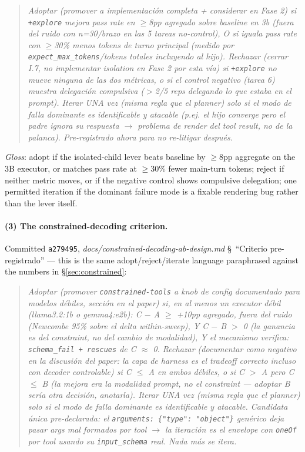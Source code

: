 \documentclass[smallcondensed,natbib]{svjour3}
\begin{document}
\begin{quote}\itshape\small
Adoptar (promover a implementaci\'on completa + considerar en Fase 2) si
\texttt{+explore} mejora pass rate en $\geq$8pp agregado sobre baseline
en 3b (fuera del ruido con n=30/brazo en las 5 tareas no-control), O si
iguala pass rate con $\geq$30\% menos tokens de turno principal (medido
por \texttt{expect\_max\_tokens}/tokens totales incluyendo al hijo).
Rechazar (cerrar I.7, no implementar isolation en Fase 2 por esta v\'ia)
si \texttt{+explore} no mueve ninguna de las dos m\'etricas, o si el
control negativo (tarea 6) muestra delegaci\'on compulsiva ($>$2/5 reps
delegando lo que estaba en el prompt). Iterar UNA vez (misma regla que
el planner) solo si el modo de falla dominante es identificable y
atacable (p.ej. el hijo converge pero el padre ignora su respuesta
$\to$ problema de render del tool result, no de la palanca).
Pre-registrado ahora para no re-litigar despu\'es.
\end{quote}

\noindent\emph{Gloss}: adopt if the isolated-child lever beats baseline
by $\geq$8pp aggregate on the 3B executor, or matches pass rate at
$\geq$30\% fewer main-turn tokens; reject if neither metric moves, or
if the negative control shows compulsive delegation; one permitted
iteration if the dominant failure mode is a fixable rendering bug
rather than the lever itself.

\paragraph{(3) The constrained-decoding criterion.} Committed
\texttt{a279495}, \emph{docs/constrained-decoding-ab-design.md}
\S~``Criterio pre-registrado'' --- this is the same adopt/reject/iterate
language paraphrased against the numbers in \S\ref{sec:constrained}:

\begin{quote}\itshape\small
Adoptar (promover \texttt{constrained-tools} a knob de config
documentado para modelos d\'ebiles, secci\'on en el paper) si, en al menos
un executor d\'ebil (llama3.2:1b o gemma4:e2b): C $-$ A $\geq$ +10pp
agregado, fuera del ruido (Newcombe 95\% sobre el delta within-sweep),
Y C $-$ B $>$ 0 (la ganancia es del constraint, no del cambio de
modalidad), Y el mecanismo verifica: \texttt{schema\_fail + rescues} de
C $\approx$ 0. Rechazar (documentar como negativo en la discusi\'on del
paper: la capa de harness es el tradeoff correcto incluso con decoder
controlable) si C $\leq$ A en ambos d\'ebiles, o si C $>$ A pero C
$\leq$ B (la mejora era la modalidad prompt, no el constraint --- adoptar
B ser\'ia otra decisi\'on, anotarla). Iterar UNA vez (misma regla que el
planner) solo si el modo de falla dominante es identificable y
atacable. Candidata \'unica pre-declarada: el
\texttt{arguments: \{"type": "object"\}} gen\'erico deja pasar args mal
formados por tool $\to$ la iteraci\'on es el envelope con \texttt{oneOf}
por tool usando su \texttt{input\_schema} real. Nada m\'as se itera.
\end{quote}
\end{document}
